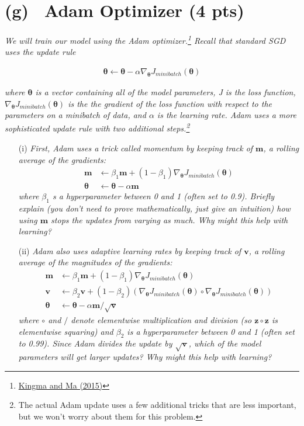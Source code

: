 \documentclass[fleqn]{MJD}
\newcommand{\subproblem}[2]{\section{(#1)~ #2}}
\newcommand{\0}{\emptyset}
\begin{document}
\newpage
\subproblem{g}{Adam Optimizer (4 pts)}
\textit{We will train our model using the Adam optimizer.\footnote{\hyperref{https://arxiv.org/pdf/1412.6980.pdf}{}{}{Kingma and Ma (2015)}} Recall that standard SGD
uses the update rule}

\begin{align}
	\bm{\theta} \leftarrow \bm{\theta} - \alpha \nabla_{\bm{\theta}} J_{minibatch}(\bm{\theta})
\end{align}

\noindent \textit{where $\bm{\theta}$ is a vector  containing all of the model parameters, J is the loss function, $\nabla_{\bm{\theta}} J_{minibatch}(\bm{\theta})$ is the the gradient of the loss function with respect to the parameters on a minibatch of data, and $\alpha$ is the learning rate. Adam uses a more sophisticated update rule with two additional steps.\footnote{The actual Adam update uses a few additional tricks that are less important, but we won’t worry about them for this problem.}} \\

\begin{enumerate}
	\item[(i)] \textit{First, Adam uses a trick called momentum by keeping track of $\bm{m}$, a rolling average of the 	gradients:}
	\begin{align}
		\bm{m} &\leftarrow \beta_{1}\bm{m} + (1 - \beta_{1}) \nabla_{\bm{\theta}} J_{minibatch}(\bm{\theta})\\
		\bm{\theta} &\leftarrow \bm{\theta} - \alpha\bm{m}
	\end{align}
	\textit{where $\beta_{1}$ s a hyperparameter between 0 and 1 (often set to 0.9). Briefly explain (you don’t need to prove mathematically, just give an intuition) how using $\bm{m}$ stops the updates from varying as much. Why might this help with learning?}
	\item[(ii)] \textit{Adam also uses adaptive learning rates by keeping track of $\bm{v}$, a rolling average of the magnitudes of the gradients:}
	\begin{align}
			\bm{m} &\leftarrow \beta_{1}\bm{m} + (1 - \beta_{1}) \nabla_{\bm{\theta}} J_{minibatch}(\bm{\theta})\\
			\bm{v} &\leftarrow \beta_{2}\bm{v} + (1 - \beta_{2})( \nabla_{\bm{\theta}} J_{minibatch}(\bm{\theta}) \circ \nabla_{\bm{\theta}} J_{minibatch}(\bm{\theta})) \\
			\bm{\theta} &\leftarrow \bm{\theta} - \alpha\bm{m} / \sqrt{\bm{v}}
	\end{align}
	\textit{where $\circ$ and $/$ denote elementwise multiplication and division (so $\bm{z} \circ \bm{z}$ is elementwise squaring) and $\beta_{2}$ is a hyperparameter between 0 and 1 (often set to 0.99). Since Adam divides the update by $\sqrt{\bm{v}}$, which of the model parameters will get larger updates? Why might this help with learning?}
\end{enumerate}
\end{document}
